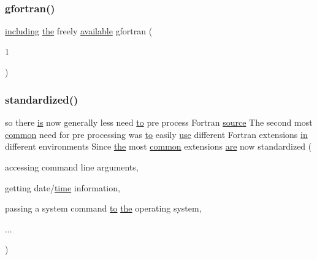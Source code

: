 \mbox{\label{ufpp__overview_81_8txt_a30683df5916ed8db82df3b81ed5b49a6}} 
\subsubsection{\texorpdfstring{gfortran()}{gfortran()}}
{\footnotesize\ttfamily \hyperlink{do_87_8txt_a8a4784becc39e4ebb9a205802f11fe2d}{including} \hyperlink{M__stopwatch_83_8txt_a0f266597de2e57eb3aa964927bb30e14}{the} freely \hyperlink{M__stopwatch_83_8txt_ab4765d078d076a26632c886ad3875761}{available} gfortran (\begin{DoxyParamCaption}\item[{1}]{ }\end{DoxyParamCaption})}

\mbox{\label{ufpp__overview_81_8txt_a39133f87f838fec468dee4ec0eda67da}} 
\subsubsection{\texorpdfstring{standardized()}{standardized()}}
{\footnotesize\ttfamily so there \hyperlink{intro__blas1_83_8txt_a42a91df93f840595de3019ceb5d1df23}{is} now generally less need \hyperlink{M__stopwatch_83_8txt_a97209fd3e34ef701c0a9734280779cbb}{to} pre process Fortran \hyperlink{ufpp__overview_81_8txt_a4d6669ece605d05985c83a04dd38e0ad}{source} The second most \hyperlink{strgar3_8f90_a96cfa8fe4e730b87185eb5629575c039}{common} need for pre processing was \hyperlink{M__stopwatch_83_8txt_a97209fd3e34ef701c0a9734280779cbb}{to} easily \hyperlink{intro__blas1_83_8txt_a04fa2694d85f67a675bb3f45f7241f48}{use} different Fortran extensions \hyperlink{M__journal_83_8txt_afce72651d1eed785a2132bee863b2f38}{in} different environments Since \hyperlink{M__stopwatch_83_8txt_a0f266597de2e57eb3aa964927bb30e14}{the} most \hyperlink{strgar3_8f90_a96cfa8fe4e730b87185eb5629575c039}{common} extensions \hyperlink{M__stopwatch_83_8txt_a5040be02b832eba08820289c8a1f81c4}{are} now standardized (\begin{DoxyParamCaption}\item[{accessing command line}]{arguments,  }\item[{getting date/\hyperlink{M__stopwatch_83_8txt_a1091fdf3a4e66042d1571c7e4ade98dd}{time}}]{information,  }\item[{passing a system command \hyperlink{M__stopwatch_83_8txt_a97209fd3e34ef701c0a9734280779cbb}{to} \hyperlink{M__stopwatch_83_8txt_a0f266597de2e57eb3aa964927bb30e14}{the} operating}]{system,  }\item[{}]{... }\end{DoxyParamCaption})\hspace{0.3cm}{\ttfamily [new]}}

